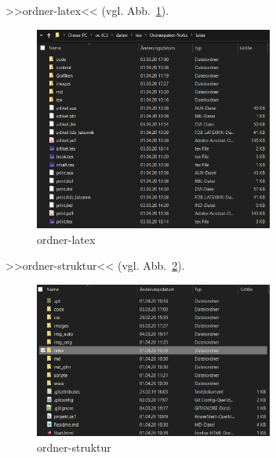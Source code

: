 >>ordner-latex<< (vgl. Abb.~\ref{fig:ordner-latex}).%
\begin{figure}[H]%
  \centering
  \includegraphics[width=0.7\textwidth]{images/ordner-latex}
  \caption{ordner-latex}%
  \label{fig:ordner-latex}%
\end{figure}
  

>>ordner-struktur<< (vgl. Abb.~\ref{fig:ordner-struktur}).%
\begin{figure}[H]%
  \centering
  \includegraphics[width=0.7\textwidth]{images/ordner-struktur}
  \caption{ordner-struktur}%
  \label{fig:ordner-struktur}%
\end{figure}
  


